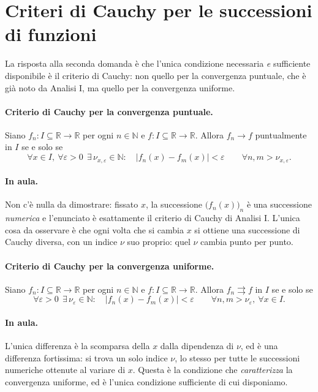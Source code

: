 \section{Criteri di Cauchy per le successioni di funzioni}

La risposta alla seconda domanda è che l'unica condizione necessaria \emph{e} sufficiente
disponibile è il criterio di Cauchy: non quello per la convergenza puntuale, che è già
noto da Analisi I, ma quello per la convergenza uniforme.

\paragraph{Criterio di Cauchy per la convergenza puntuale.} Siano
$f_n:I\subseteq\mathbb{R}\to\mathbb{R}$ per ogni $n\in\mathbb{N}$ e
$f:I\subseteq\mathbb{R}\to\mathbb{R}$. Allora $f_n\to f$ puntualmente in $I$ se e solo se
\begin{equation}
\forall x\in I,\ \forall\varepsilon>0\ \ \exists\,\nu_{x,\varepsilon}\in\mathbb{N}:\quad
|f_n(x)-f_m(x)|<\varepsilon\qquad\forall n,m>\nu_{x,\varepsilon}.
\end{equation}

\paragraph{In aula.} Non c'è nulla da dimostrare: fissato $x$, la successione
$\big(f_n(x)\big)_n$ è una successione \emph{numerica} e l'enunciato è esattamente il
criterio di Cauchy di Analisi I. L'unica cosa da osservare è che ogni volta che si cambia
$x$ si ottiene una successione di Cauchy diversa, con un indice $\nu$ suo proprio: quel
$\nu$ cambia punto per punto.

\paragraph{Criterio di Cauchy per la convergenza uniforme.} Siano $f_n:I\subseteq\mathbb{R}\to\mathbb{R}$ per ogni $n\in\mathbb{N}$ e
$f:I\subseteq\mathbb{R}\to\mathbb{R}$. Allora $f_n\rightrightarrows f$ in $I$ se e solo se
\begin{equation}
\forall\varepsilon>0\ \ \exists\,\nu_{\varepsilon}\in\mathbb{N}:\quad
|f_n(x)-f_m(x)|<\varepsilon\qquad\forall n,m>\nu_{\varepsilon},\ \forall x\in I.
\end{equation}

\paragraph{In aula.} L'unica differenza è la scomparsa della $x$ dalla dipendenza di
$\nu$, ed è una differenza fortissima: si trova un solo indice $\nu$, lo stesso per tutte
le successioni numeriche ottenute al variare di $x$. Questa è la condizione che
\emph{caratterizza} la convergenza uniforme, ed è l'unica condizione sufficiente di cui
disponiamo.

